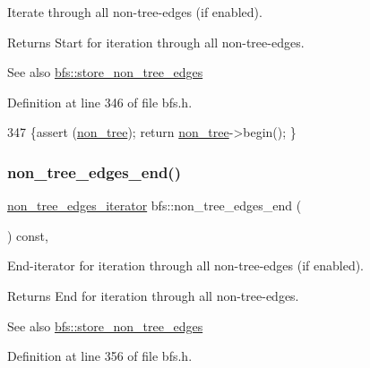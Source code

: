 Iterate through all non-\/tree-\/edges (if enabled). 

\begin{DoxyReturn}{Returns}
Start for iteration through all non-\/tree-\/edges. 
\end{DoxyReturn}
\begin{DoxySeeAlso}{See also}
\mbox{\hyperlink{classbfs_a7de47b820fb9532f497660f767c9457f}{bfs\+::store\+\_\+non\+\_\+tree\+\_\+edges}} 
\end{DoxySeeAlso}


Definition at line 346 of file bfs.\+h.


\begin{DoxyCode}
347     \{assert (\mbox{\hyperlink{classbfs_a056b2131db11e62eb8f41c8dcc117d2e}{non\_tree}});  \textcolor{keywordflow}{return} \mbox{\hyperlink{classbfs_a056b2131db11e62eb8f41c8dcc117d2e}{non\_tree}}->begin(); \}
\end{DoxyCode}
\mbox{\label{classbfs_a9fb470cd36eb487004ca28c1723cabda}} 
\subsubsection{\texorpdfstring{non\+\_\+tree\+\_\+edges\+\_\+end()}{non\_tree\_edges\_end()}}
{\footnotesize\ttfamily \mbox{\hyperlink{classbfs_a89ec32919076618d9eef18990fef543f}{non\+\_\+tree\+\_\+edges\+\_\+iterator}} bfs\+::non\+\_\+tree\+\_\+edges\+\_\+end (\begin{DoxyParamCaption}{ }\end{DoxyParamCaption}) const\hspace{0.3cm}{\ttfamily [inline]}, {\ttfamily [inherited]}}



End-\/iterator for iteration through all non-\/tree-\/edges (if enabled). 

\begin{DoxyReturn}{Returns}
End for iteration through all non-\/tree-\/edges. 
\end{DoxyReturn}
\begin{DoxySeeAlso}{See also}
\mbox{\hyperlink{classbfs_a7de47b820fb9532f497660f767c9457f}{bfs\+::store\+\_\+non\+\_\+tree\+\_\+edges}} 
\end{DoxySeeAlso}


Definition at line 356 of file bfs.\+h.


